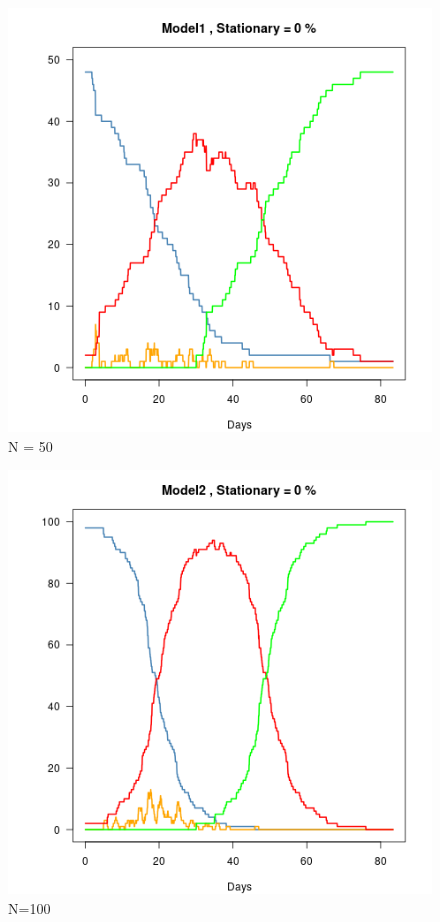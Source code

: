\documentclass{article}\usepackage[]{graphicx}\usepackage[]{color}
\begin{document}
\begin{figure}
\includegraphics[width=1\textwidth]{Model1.png}
\caption{N = 50}
\end{figure}

\begin{figure}
\includegraphics[width=1\textwidth]{Model2.png}
\caption{N=100}
\end{figure}
\end{document}

